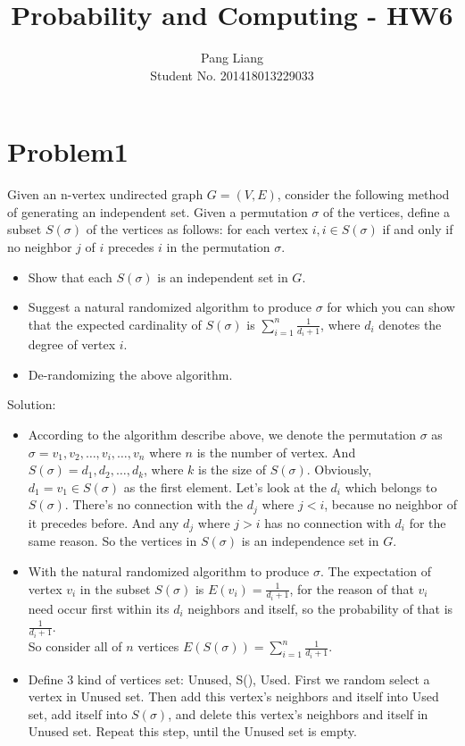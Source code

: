 \documentclass[12pt]{article}
\title{Probability and Computing - HW6}
\author{Pang Liang\\ Student No. 201418013229033}
\begin{document}
\maketitle

\section{Problem1}
Given an n-vertex undirected graph $G = (V, E)$, consider the following method of generating an independent set. Given a permutation $\sigma$ of the vertices, define a subset $S(\sigma)$ of the vertices as follows: for each vertex $i, i \in S(\sigma)$ if and only if no neighbor $j$ of $i$ precedes $i$ in the permutation $\sigma$.

\begin{itemize}
\item Show that each $S(\sigma)$ is an independent set in $G$.
\item Suggest a natural randomized algorithm to produce $\sigma$ for which you can show that the expected cardinality of $S(\sigma)$ is $\sum_{i=1}^{n} \frac{1}{d_i+1}$, where $d_i$ denotes the degree of vertex $i$.
\item De-randomizing the above algorithm.
\end{itemize}

Solution:\\
\begin{itemize}
\item
According to the algorithm describe above, we denote the permutation $\sigma$ as $\sigma = {v_1, v_2, \dots, v_i, \dots, v_n}$ where $n$ is the number of vertex. And $S(\sigma)={d_1, d_2, \dots, d_k}$, where $k$ is the size of $S(\sigma)$. Obviously, $d_1 = v_1 \in S(\sigma)$ as the first element. Let's look at the $d_i$ which belongs to $S(\sigma)$. There's no connection with the $d_j$ where $j<i$, because no neighbor of it precedes before. And any $d_j$ where $j>i$ has no connection with $d_i$ for the same reason. So the vertices in $S(\sigma)$ is an independence set in $G$.

\item
With the natural randomized algorithm to produce $\sigma$. The expectation of vertex $v_i$ in the subset $S(\sigma)$ is $E(v_i) = \frac{1}{d_i+1}$, for the reason of that $v_i$ need occur first within its $d_i$ neighbors and itself, so the probability of that is $\frac{1}{d_i+1}$.\\
So consider all of $n$ vertices $E(S(\sigma)) = \sum_{i=1}^{n} \frac{1}{d_i+1}$.

\item
Define 3 kind of vertices set: Unused, S(\sigma), Used. First we random select a vertex in Unused set. Then add this vertex's neighbors and itself into Used set, add itself into $S(\sigma)$, and delete this vertex's neighbors and itself in Unused set. Repeat this step, until the Unused set is empty. 

\end{itemize}
\end{document}
